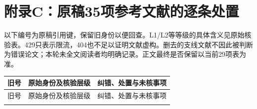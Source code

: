 \clearpage\section{附录C：原稿35项参考文献的逐条处置}
以下编号为原稿引用键，保留旧身份以便回查。L1/L2等等级的具体含义见原始核验表。429只表示限流，404也不足以证明文献虚构。删去的支线文献不因此被判断为错误论文；本轮未全文阅读者均明确记录。正文最终是否保留以当前29项表为准。
\begingroup\fontsize{9}{11.5}\selectfont\setlength{\parskip}{1pt}\setlength{\parindent}{0pt}
\begin{longtable}{@{}>{\raggedright\arraybackslash}p{0.7cm}>{\raggedright\arraybackslash}p{7.0cm}>{\raggedright\arraybackslash}p{7.8cm}@{}}
\toprule
旧号 & 原始身份及核验层级 & 纠错、处置与未核事项 \\
\midrule
\endfirsthead
\toprule
旧号 & 原始身份及核验层级 & 纠错、处置与未核事项 \\
\midrule
\endhead
\bottomrule
\endfoot


\end{longtable}
